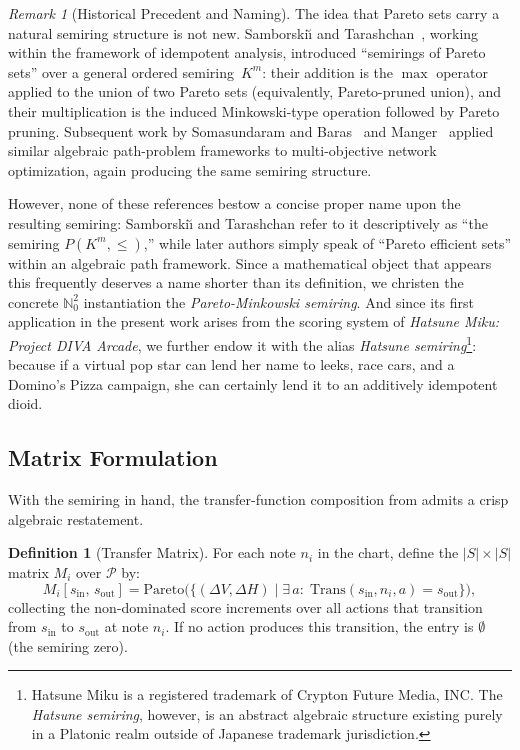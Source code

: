 \documentclass[11pt, letterpaper]{article}
\theoremstyle{definition}
\newtheorem{definition}[theorem]{Definition}
\theoremstyle{remark}
\newtheorem{remark}[theorem]{Remark}
\begin{document}
\begin{remark}[Historical Precedent and Naming]
\label{rem:naming}
The idea that Pareto sets carry a natural semiring structure is not new.
Samborski{\u\i} and Tarashchan~\cite{Samborskii1992}, working within the framework of idempotent analysis, introduced ``semirings of Pareto sets'' over a general ordered semiring~$K^m$: their addition is the $\max$ operator applied to the union of two Pareto sets (equivalently, Pareto-pruned union), and their multiplication is the induced Minkowski-type operation followed by Pareto pruning.
Subsequent work by Somasundaram and Baras~\cite{Somasundaram2011} and Manger~\cite{Manger2020} applied similar algebraic path-problem frameworks to multi-objective network optimization, again producing the same semiring structure.

However, none of these references bestow a concise proper name upon the resulting semiring: Samborski{\u\i} and Tarashchan refer to it descriptively as ``the semiring $P(K^m, \leqslant)$,'' while later authors simply speak of ``Pareto efficient sets'' within an algebraic path framework.
Since a mathematical object that appears this frequently deserves a name shorter than its definition, we christen the concrete $\mathbb{N}_0^2$ instantiation the \emph{Pareto-Minkowski semiring}.
And since its first application in the present work arises from the scoring system of \textit{Hatsune Miku: Project DIVA Arcade}, we further endow it with the alias \emph{Hatsune semiring}\footnote{Hatsune Miku is a registered trademark of Crypton Future Media, INC. The \emph{Hatsune semiring}, however, is an abstract algebraic structure existing purely in a Platonic realm outside of Japanese trademark jurisdiction.}: because if a virtual pop star can lend her name to leeks, race cars, and a Domino's Pizza campaign, she can certainly lend it to an additively idempotent dioid.
\end{remark}

\subsection{Matrix Formulation}

With the semiring in hand, the transfer-function composition from \cite{Chang2026} admits a crisp algebraic restatement.

\begin{definition}[Transfer Matrix]
\label{def:transfer-matrix}
For each note $n_i$ in the chart, define the $|S| \times |S|$ matrix $M_i$ over $\mathcal{P}$ by:
\[
    M_i[s_{\mathrm{in}},\, s_{\mathrm{out}}]
    = \mathrm{Pareto}\!\bigl(\{(\Delta V, \Delta H) \mid \exists\, a:\; \mathrm{Trans}(s_{\mathrm{in}}, n_i, a) = s_{\mathrm{out}}\}\bigr),
\]
collecting the non-dominated score increments over all actions that transition from $s_{\mathrm{in}}$ to $s_{\mathrm{out}}$ at note $n_i$.
If no action produces this transition, the entry is $\emptyset$ (the semiring zero).
\end{definition}
\end{document}
